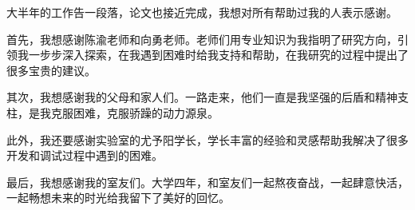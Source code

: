 
\begin{acknowledgements}

大半年的工作告一段落，论文也接近完成，我想对所有帮助过我的人表示感谢。

首先，我想感谢陈渝老师和向勇老师。老师们用专业知识为我指明了研究方向，引领我一步步深入探索，在我遇到困难时给我支持和帮助，在我研究的过程中提出了很多宝贵的建议。

其次，我想感谢我的父母和家人们。一路走来，他们一直是我坚强的后盾和精神支柱，是我克服困难，克服骄躁的动力源泉。

此外，我还要感谢实验室的尤予阳学长，学长丰富的经验和灵感帮助我解决了很多开发和调试过程中遇到的困难。

最后，我想感谢我的室友们。大学四年，和室友们一起熬夜奋战，一起肆意快活，一起畅想未来的时光给我留下了美好的回忆。

\end{acknowledgements}
